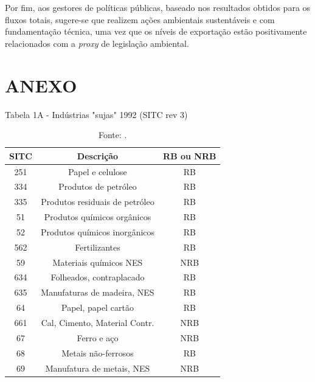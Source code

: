Por fim, aos gestores de políticas públicas, baseado nos resultados obtidos para os fluxos totais, sugere-se que realizem ações ambientais sustentáveis e com fundamentação técnica, uma vez que os níveis de exportação estão positivamente relacionados com a \textit{proxy} de legislação ambiental.



\newpage

\section*{ANEXO}

\begin{table}[H]
	\centering
	\caption*{Tabela 1A - Indústrias "sujas" 1992 (SITC rev 3)}
	\label{tab:7}
	\begin{tabular}{ccc}
		  SITC & Descrição & RB ou NRB \\ \toprule  251 & Papel e celulose & RB \\ 334 & Produtos de petróleo & RB \\ 335 & Produtos residuais de petróleo & RB \\ 51 & Produtos químicos orgânicos & RB \\ 52 & Produtos químicos inorgânicos & RB \\ 562 & Fertilizantes & RB \\ 59 & Materiais químicos NES & NRB \\ 634 & Folheados, contraplacado & RB \\ 635 & Manufaturas de madeira, NES & RB \\ 64 & Papel, papel cartão & RB \\ 661 & Cal, Cimento, Material Contr. & NRB \\ 67 & Ferro e aço & NRB \\ 68 & Metais não-ferrosos & RB \\ 69 & Manufatura de metais, NES & NRB \\ \bottomrule 
	\end{tabular}
\caption*{\RaggedRight  Fonte: \cite[tradução nossa]{VanBeers1997}.}
\end{table}


